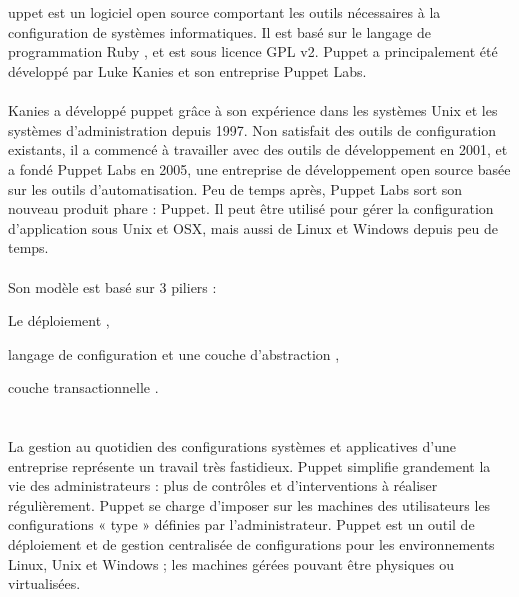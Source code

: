 \documentclass[a4paper, 10pt, onecolumn]{report}
\begin{document}
\section{}
uppet est un logiciel open source comportant les outils nécessaires à la configuration de
systèmes informatiques. Il est basé sur le langage de programmation Ruby , et est sous licence
GPL v2. Puppet a principalement été développé par Luke Kanies et son entreprise Puppet
Labs.\\
\\
Kanies a développé puppet grâce à son expérience dans les systèmes Unix et les systèmes
d’administration depuis 1997. Non satisfait des outils de configuration existants, il a commencé
à travailler avec des outils de développement en 2001, et a fondé Puppet Labs en 2005, une
entreprise de développement open source basée sur les outils d’automatisation. Peu de temps
après, Puppet Labs sort son nouveau produit phare : Puppet. Il peut être utilisé pour gérer la
configuration d’application sous Unix et OSX, mais aussi de Linux et Windows depuis peu de
temps.\\
\\
Son modèle est basé sur 3 piliers :
\be
	\item Le déploiement ,
	\item langage de configuration et une couche d’abstraction ,
	\item couche transactionnelle .
\ee

\section{}
La gestion au quotidien des configurations systèmes et applicatives d’une entreprise représente
un travail très fastidieux. Puppet simplifie grandement la vie des administrateurs : plus de
contrôles et d’interventions à réaliser régulièrement. Puppet se charge d’imposer sur les
machines des utilisateurs les configurations « type » définies par l’administrateur. Puppet est un
outil de déploiement et de gestion centralisée de configurations pour les environnements Linux,
Unix et Windows ; les machines gérées pouvant être physiques ou virtualisées.
\end{document}
